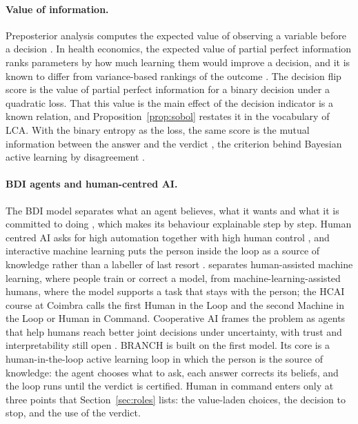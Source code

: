 \documentclass{article}
\begin{document}
\paragraph{Value of information.}
Preposterior analysis computes the expected value of observing a variable before a decision
\citep{raiffa1961,howard1966}. In health economics, the expected value of partial perfect information
ranks parameters by how much learning them would improve a decision, and it is known to differ from
variance-based rankings of the outcome \citep{felli1998,oakley2004,strong2013}. The decision flip score is
the value of partial perfect information for a binary decision under a quadratic loss. That this value is
the main effect of the decision indicator is a known relation, and Proposition~\ref{prop:sobol} restates
it in the vocabulary of LCA. With the binary entropy as the loss, the
same score is the mutual information between the answer and the verdict \citep{lindley1956}, the
criterion behind Bayesian active learning by disagreement \citep{houlsby2011}.

\paragraph{BDI agents and human-centred AI.}
The BDI model separates what an agent believes, what it wants and what it is committed to doing
\citep{bratman1987,rao1995}, which makes its behaviour explainable step by step. Human centred AI asks
for high automation together with high human control \citep{shneiderman2022}, and interactive machine
learning puts the person inside the loop as a source of knowledge rather than a labeller of last resort
\citep{amershi2014}. \citet{munro2021} separates human-assisted machine learning, where people train or
correct a model, from machine-learning-assisted humans, where the model supports a task that stays with the
person; the HCAI course at Coimbra calls the first Human in the Loop and the second Machine in the Loop or
Human in Command. Cooperative AI frames the problem as agents that help humans reach better joint decisions
under uncertainty, with trust and interpretability still open \citep{dafoe2020}. BRANCH is built on the
first model. Its core is a human-in-the-loop active learning loop in which the person is the source of
knowledge: the agent chooses what to ask, each answer corrects its beliefs, and the loop runs until the
verdict is certified. Human in command enters only at three points that Section~\ref{sec:roles} lists:
the value-laden choices, the decision to stop, and the use of the verdict.
\end{document}
